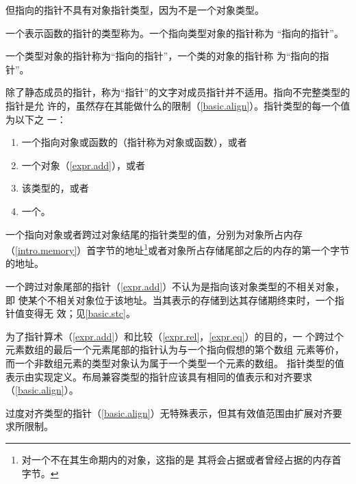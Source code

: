 \begin{note}
  但指向的指针不具有对象指针类型，因为不是一个对象类型。
\end{note}

一个表示函数的指针的类型称为。一个指向类型对象的指针称为
“指向的指针”。

\begin{example}
  一个类型对象的指针称为“指向的指针”，一个类的对象的指针称
  为“指向的指针”。
\end{example}

除了静态成员的指针，称为“指针”的文字对成员指针并不适用。指向不完整类型的指针是允
许的，虽然存在其能做什么的限制（\ref{basic.align}）。指针类型的每一个值为以下之
一：
\begin{enumerate}
  \item 一个指向对象或函数的（指针称为对象或函数），或者
  \item {}一个对象（\ref{expr.add}），或者
  \item 该类型的，或者
  \item 一个。
\end{enumerate}
一个指向对象或者跨过对象结尾的指针类型的值，分别为对象所占内存
（\ref{intro.memory}）首字节的地址\footnote{对一个不在其生命期内的对象，这指的是
其将会占据或者曾经占据的内存首字节。}或者对象所占存储尾部之后的内存的第一个字节
的地址。

\begin{note}
  一个跨过对象尾部的指针（\ref{expr.add}）不认为是指向该对象类型的不相关对象，即
  使某个不相关对象位于该地址。当其表示的存储到达其存储期终束时，一个指针值变得无
  效；见\ref{basic.stc}。
\end{note}

为了指针算术（\ref{expr.add}）和比较（\ref{expr.rel}，\ref{expr.eq}）的目的，一
个跨过个元素数组的最后一个元素尾部的指针认为与一个指向假想的第个数组
元素等价，而一个非数组元素的类型对象认为属于一个类型一个元素的数组。
指针类型的值表示由实现定义。布局兼容类型的指针应该具有相同的值表示和对齐要求
（\ref{basic.align}）。

\begin{note}
  过度对齐类型的指针（\ref{basic.align}）无特殊表示，但其有效值范围由扩展对齐要
  求所限制。
\end{note}

